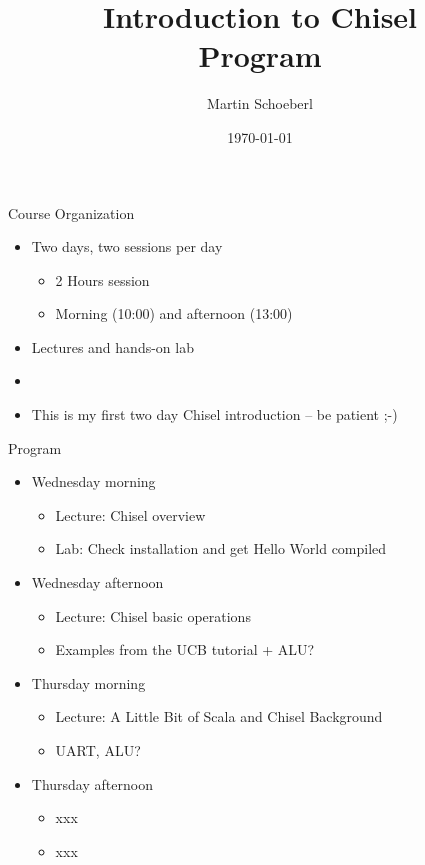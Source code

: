 \documentclass[xcolor=pdflatex,dvipsnames,table]{beamer}
\title{Introduction to Chisel\\Program}
\author{Martin Schoeberl}
\date{\today}
\institute{Technical University of Denmark}
\begin{document}
\begin{frame}
\titlepage
\end{frame}


\begin{frame}[fragile]{Course Organization}
\begin{itemize}
\item Two days, two sessions per day
\begin{itemize}
\item 2 Hours session
\item Morning (10:00) and afternoon (13:00)
\end{itemize}
\item Lectures and hands-on lab
\item 
\item This is my first two day Chisel introduction -- be patient ;-)
\end{itemize}
\end{frame}

\begin{frame}[fragile]{Program}
\begin{itemize}
\item Wednesday morning
\begin{itemize}
\item Lecture: Chisel overview
\item Lab: Check installation and get Hello World compiled
\end{itemize}
\item Wednesday afternoon
\begin{itemize}
\item Lecture: Chisel basic operations
\item Examples from the UCB tutorial + ALU?
\end{itemize}
\item Thursday morning
\begin{itemize}
\item Lecture: A Little Bit of Scala and Chisel Background 
\item UART, ALU?
\end{itemize}
\item Thursday afternoon
\begin{itemize}
\item xxx
\item xxx
\end{itemize}
\end{itemize}
\end{frame}
\end{document}
